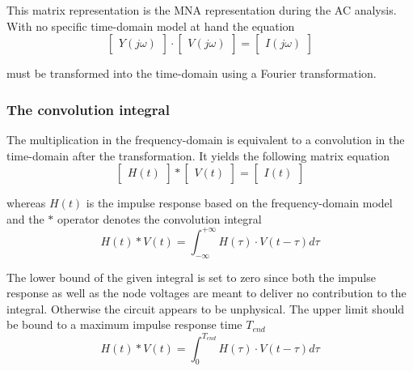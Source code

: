This matrix representation is the MNA representation during the AC
analysis.  With no specific time-domain model at hand the equation
\begin{equation}
\begin{bmatrix}
Y\left(j\omega\right)
\end{bmatrix}
\cdot
\begin{bmatrix}
V\left(j\omega\right)
\end{bmatrix}
=
\begin{bmatrix}
I\left(j\omega\right)
\end{bmatrix}
\end{equation}

must be transformed into the time-domain using a Fourier
transformation.

\subsubsection{The convolution integral}

The multiplication in the frequency-domain is equivalent to a
convolution in the time-domain after the transformation.  It yields
the following matrix equation
\begin{equation}
\begin{bmatrix}
H\left(t\right)
\end{bmatrix}
*
\begin{bmatrix}
V\left(t\right)
\end{bmatrix}
=
\begin{bmatrix}
I\left(t\right)
\end{bmatrix}
\end{equation}

whereas $H\left(t\right)$ is the impulse response based on the
frequency-domain model and the $*$ operator denotes the convolution
integral
\begin{equation}
H\left(t\right)
*
V\left(t\right)
=
\int^{+\infty}_{-\infty} H\left(\tau\right)\cdot V\left(t-\tau\right) d\tau
\end{equation}

The lower bound of the given integral is set to zero since both the
impulse response as well as the node voltages are meant to deliver no
contribution to the integral.  Otherwise the circuit appears to be
unphysical.  The upper limit should be bound to a maximum impulse
response time $T_{end}$
\begin{equation}
\label{eq:ConvolutionT}
H\left(t\right)
*
V\left(t\right)
=
\int^{T_{end}}_{0} H\left(\tau\right)\cdot V\left(t-\tau\right) d\tau
\end{equation}

